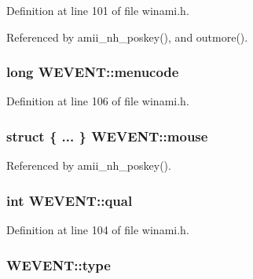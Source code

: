 Definition at line 101 of file winami.\+h.



Referenced by amii\+\_\+nh\+\_\+poskey(), and outmore().

\hypertarget{structWEVENT_a37d8a22af42f56bedf26367521257f31}{
\subsubsection[{menucode}]{\setlength{\rightskip}{0pt plus 5cm}long W\+E\+V\+E\+N\+T\+::menucode}}\label{structWEVENT_a37d8a22af42f56bedf26367521257f31}


Definition at line 106 of file winami.\+h.

\hypertarget{structWEVENT_a28753a26ccd665dcb9d2a253556911ef}{
\subsubsection[{mouse}]{\setlength{\rightskip}{0pt plus 5cm}struct \{ ... \}   W\+E\+V\+E\+N\+T\+::mouse}}\label{structWEVENT_a28753a26ccd665dcb9d2a253556911ef}


Referenced by amii\+\_\+nh\+\_\+poskey().

\hypertarget{structWEVENT_a9dd2bf0011530edde4bf5b5129f99d2e}{
\subsubsection[{qual}]{\setlength{\rightskip}{0pt plus 5cm}int W\+E\+V\+E\+N\+T\+::qual}}\label{structWEVENT_a9dd2bf0011530edde4bf5b5129f99d2e}


Definition at line 104 of file winami.\+h.

\hypertarget{structWEVENT_a218bdffc41cff7b53f666a9a1f0fd714}{
\subsubsection[{type}]{ W\+E\+V\+E\+N\+T\+::type}}\label{structWEVENT_a218bdffc41cff7b53f666a9a1f0fd714}


